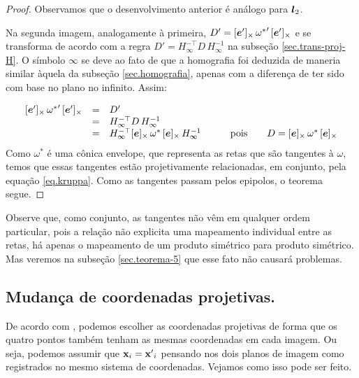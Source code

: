 \begin{proof}
Observamos que o desenvolvimento anterior é análogo para $\boldsymbol{l}_2$.

Na segunda imagem, analogamente à primeira, $D'=[\boldsymbol{e}']_\times\,{{\bf \omega}^*}'\,[\boldsymbol{e}']_\times$ e se transforma de acordo com a regra $D'=H_\infty^{-\top}D\,H_\infty^{-1}$ na subseção \ref{sec.trans-proj-H}. O símbolo $\infty$ se deve ao fato de que a homografia foi deduzida de maneria similar àquela da subseção  \ref{sec.homografia}, apenas com a diferença de ter sido com base no plano no infinito. Assim:

\begin{equation}\label{eq.kruppa}
\begin{array}{rcll}
[\boldsymbol{e}']_\times\,{{\bf \omega}^*}'\,[\boldsymbol{e}']_\times&=&D'&\\
&=&H_\infty^{-\top}D\,H_\infty^{-1}&\\
&=&H_\infty^{-\top}[\boldsymbol{e}]_\times\,{\bf \omega}^*\,[\boldsymbol{e}]_\times\,H_\infty^{-1}&\qquad\text{pois}\qquad D=[\boldsymbol{e}]_\times\,{\bf \omega}^*\,[\boldsymbol{e}]_\times\\
\end{array}
\end{equation}
Como $\omega^*$ é uma cônica envelope, que representa as retas que são tangentes à $\omega$, temos que essas tangentes estão projetivamente relacionadas, em conjunto, pela equação \ref{eq.kruppa}. Como as tangentes passam pelos epipolos, o teorema segue.

\end{proof}
Observe que, como conjunto, as tangentes não vêm em qualquer ordem particular, pois a relação não explicita uma mapeamento individual entre as retas, há apenas o mapeamento de um produto simétrico para produto simétrico. Mas veremos na subseção \ref{sec.teorema-5} que esse fato não causará problemas.



\subsection{Mudança de coordenadas projetivas.}

De acordo com \cite{kneebone}, podemos escolher as coordenadas projetivas de forma que os quatro pontos também tenham as mesmas coordenadas em cada imagem. Ou seja, podemos assumir que ${\bf x}_i = {\bf x'}_i$ pensando nos dois planos de imagem como registrados no mesmo sistema de coordenadas. Vejamos como isso pode ser feito.

